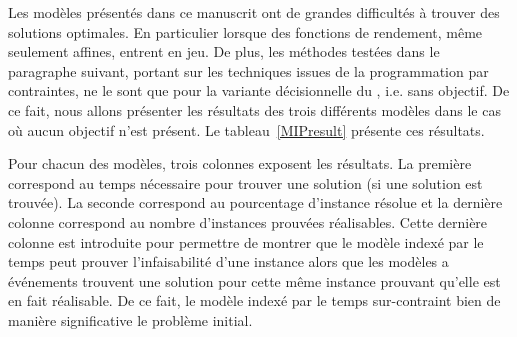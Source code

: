 Les modèles présentés dans ce manuscrit ont de grandes difficultés à
trouver des solutions optimales. En particulier lorsque des fonctions
de rendement, même seulement affines, entrent en jeu. De plus, les
méthodes testées dans le paragraphe suivant, portant sur les techniques
issues de la programmation par contraintes, ne le sont que pour la
variante décisionnelle du \CECSP, i.e. sans objectif. De ce fait, nous
allons présenter les résultats des trois différents modèles dans le
cas où aucun objectif n'est présent. Le tableau~\ref{MIPresult}
présente ces résultats. 

Pour chacun des modèles, trois colonnes exposent les résultats. La
première correspond au temps nécessaire pour trouver une solution (si
une solution est trouvée). La seconde correspond au pourcentage
d'instance résolue et la dernière colonne correspond au nombre
d'instances prouvées réalisables. Cette dernière colonne est introduite
pour permettre de montrer que le modèle indexé par le temps peut
prouver l'infaisabilité d'une instance alors que les modèles a
événements trouvent une solution pour cette même instance prouvant
qu'elle est en fait réalisable. De ce fait, le modèle indexé par le
temps sur-contraint bien de manière significative le problème initial.

